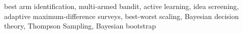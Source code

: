 \documentclass[nonblindrev]{informs3}
\begin{document}


\KEYWORDS
{best arm identification, multi-armed bandit, active learning, idea screening, adaptive maximum-difference surveys, best-worst scaling, Bayesian decision theory, Thompson Sampling, Bayesian bootstrap}




\maketitle



\end{document}
